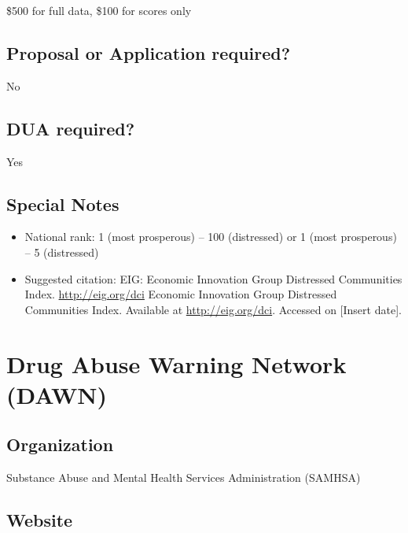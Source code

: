 \documentclass[
]{book}
\providecommand{\tightlist}{%
  \setlength{\itemsep}{0pt}\setlength{\parskip}{0pt}}
\begin{document}
\$500 for full data, \$100 for scores only

\hypertarget{proposal-or-application-required-23}{%
\section{Proposal or Application required?}\label{proposal-or-application-required-23}}

No

\hypertarget{dua-required-23}{%
\section{DUA required?}\label{dua-required-23}}

Yes

\hypertarget{special-notes-23}{%
\section{Special Notes}\label{special-notes-23}}

\begin{itemize}
\tightlist
\item
  National rank: 1 (most prosperous) -- 100 (distressed) or 1 (most prosperous) -- 5 (distressed)
\item
  Suggested citation: EIG: Economic Innovation Group Distressed Communities Index. \url{http://eig.org/dci} Economic Innovation Group Distressed Communities Index. Available at \url{http://eig.org/dci}. Accessed on {[}Insert date{]}.
\end{itemize}

\mainmatter

\hypertarget{drug-abuse-warning-network-dawn}{%
\chapter{Drug Abuse Warning Network (DAWN)}\label{drug-abuse-warning-network-dawn}}

\hypertarget{organization-24}{%
\section{Organization}\label{organization-24}}

Substance Abuse and Mental Health Services Administration (SAMHSA)

\hypertarget{website-24}{%
\section{Website}\label{website-24}}
\end{document}
